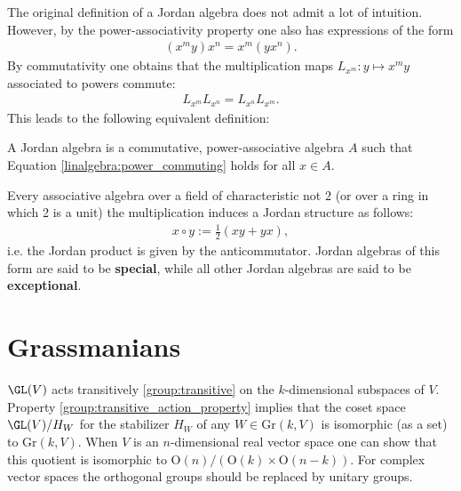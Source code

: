     The original definition of a Jordan algebra does not admit a lot of intuition. However, by the power-associativity property one also has expressions of the form
    \begin{gather}
        (x^my)x^n = x^m(yx^n).
    \end{gather}
    By commutativity one obtains that the multiplication maps $L_{x^m}:y\mapsto x^my$ associated to powers commute:
    \begin{gather}
        \label{linalgebra:power_commuting}
        L_{x^m}L_{x^n} = L_{x^n}L_{x^m}.
    \end{gather}
    This leads to the following equivalent definition:
    \begin{adefinition}
        A Jordan algebra is a commutative, power-associative algebra $A$ such that Equation \eqref{linalgebra:power_commuting} holds for all $x\in A$.
    \end{adefinition}

    \begin{property}
        Every associative algebra over a field of characteristic not 2 (or over a ring in which 2 is a unit) the multiplication induces a Jordan structure as follows:
        \begin{gather}
            x\circ y := \frac{1}{2}(xy+yx),
        \end{gather}
        i.e. the Jordan product is given by the anticommutator. Jordan algebras of this form are said to be \textbf{special}, while all other Jordan algebras are said to be \textbf{exceptional}.
    \end{property}

\section{Grassmanians}

    \begin{property}\label{linalgebra:grassmannian_construction}
        $\GL(V)$ acts transitively \ref{group:transitive} on the $k$-dimensional subspaces of $V$. Property \ref{group:transitive_action_property} implies that the coset space $\GL(V)/H_W$ for the stabilizer $H_W$ of any $W\in\mathrm{Gr}(k,V)$ is isomorphic (as a set) to $\mathrm{Gr}(k,V)$. When $V$ is an $n$-dimensional real vector space one can show that this quotient is isomorphic to $\mathrm{O}(n)/(\mathrm{O}(k)\times\mathrm{O}(n-k))$. For complex vector spaces the orthogonal groups should be replaced by unitary groups.
    \end{property}

